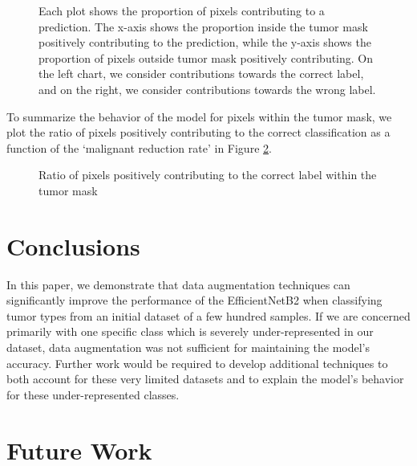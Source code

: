 \documentclass[sn-mathphys,Numbered]{sn-jnl}%
\theoremstyle{thmstyleone}%
\theoremstyle{thmstyletwo}%
\theoremstyle{thmstylethree}%
\begin{document}
\begin{figure}[!htbp]
    \centering


    \caption{Each plot shows the proportion of pixels contributing to a prediction.  The x-axis shows the proportion inside the tumor mask positively contributing to the prediction, while the y-axis shows the proportion of pixels outside tumor mask positively contributing.  On the left chart, we consider contributions towards the correct label, and on the right, we consider contributions towards the wrong label.}
    \label{fig:proportion}
\end{figure}



To summarize the behavior of the model for pixels within the tumor mask, we plot the ratio of pixels positively contributing to the correct classification as a function of the `malignant reduction rate' in Figure \ref{fig:mal_ben_line}.
\begin{figure}[!htbp]
    \centering


    \caption{Ratio of pixels positively contributing to the correct label within the tumor mask}
    \label{fig:mal_ben_line}
\end{figure}
\section{Conclusions}\label{sec_conclusion}
In this paper, we demonstrate that data augmentation techniques can significantly improve the performance of the EfficientNetB2 when classifying tumor types from an initial dataset of a few hundred samples.  If we are concerned primarily with one specific class which is severely under-represented in our dataset, data augmentation was not sufficient for maintaining the model's accuracy.  Further work would be required to develop additional techniques to both account for these very limited datasets and to explain the model's behavior for these under-represented classes.  
\section{Future Work}\label{sec_future}
\end{document}
